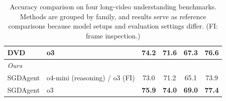 \documentclass[letterpaper]{article} %
\begin{document}
\begin{table}[!tb]
\begin{tabular}{@{}llcccc@{}}
    DVD~\cite{deepvideo2025}
      & o3            & 74.2 & 71.6 & 67.3 & 76.6 \\
    \midrule
    \multicolumn{6}{l}{\textit{Ours}} \\
    SGDAgent
      & o4-mini (reasoning) / o3 (FI)      & 73.0 & 71.2 & 65.1 & 73.9 \\
    SGDAgent
      & o3            & \textbf{75.9} & \textbf{74.0} & \textbf{69.0} & \textbf{77.4} \\
    \bottomrule
  \end{tabular}
  \caption{Accuracy comparison on four long-video understanding benchmarks.
  Methods are grouped by family, and results serve as reference comparisons because model setups and evaluation settings differ. (FI: frame inspection.)}
  \label{tab:main_comparison}
  \vspace{-0.1in}
\end{table}


\end{document}
